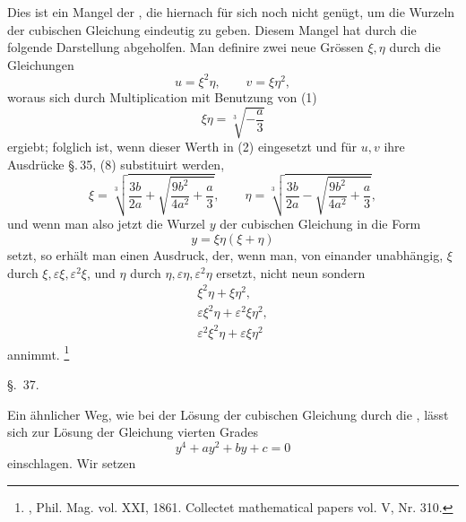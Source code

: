 
Dies ist ein Mangel der , die hiernach für sich noch nicht genügt, um die Wurzeln der cubischen Gleichung eindeutig zu geben. Diesem Mangel hat  durch die folgende Darstellung abgeholfen. Man definire zwei neue Grössen $\xi,\eta$ durch die Gleichungen
\begin{equation}
u=\xi^2\eta,
\qquad
v=\xi\eta^2,
\tag{2}
\end{equation}
woraus sich durch Multiplication mit Benutzung von (1)
\begin{equation}
\xi\eta=\sqrt[3]{-\frac a3}
\tag{3}
\end{equation}
ergiebt; folglich ist, wenn dieser Werth in (2) eingesetzt und für $u,v$ ihre Ausdrücke \S.\,35, (8) substituirt werden,
\begin{equation}
\xi=\sqrt[3]{\frac{3b}{2a}+\sqrt{\frac{9b^2}{4a^2}+\frac a3}},\qquad
\eta=\sqrt[3]{\frac{3b}{2a}-\sqrt{\frac{9b^2}{4a^2}+\frac a3}},
\tag{4}
\end{equation}
und wenn man also jetzt die Wurzel $y$ der cubischen Gleichung in die Form
\begin{equation}
y=\xi\eta(\xi+\eta)
\tag{5}
\end{equation}
setzt, so erhält man einen Ausdruck, der, wenn man, von einander unabhängig, $\xi$ durch $\xi,\varepsilon\xi,\varepsilon^2\xi$, und $\eta$ durch $\eta,\varepsilon\eta,\varepsilon^2\eta$ ersetzt, nicht neun sondern 
\[
\begin{array}{c}
\xi^2\eta+\xi\eta^2,\\
\varepsilon\xi^2\eta+\varepsilon^2\xi\eta^2,\\
\varepsilon^2\xi^2\eta+\varepsilon\xi\eta^2
\end{array}
\]
annimmt.
\footnote{, Phil. Mag. vol. XXI, 1861. Collectet mathematical papers vol. V, Nr. 310.}%



\begin{center}
{\large \S.\ 37.}

\vspace{0.5em}
{\large{}}
\end{center}

Ein ähnlicher Weg, wie bei der Lösung der cubischen Gleichung durch die , lässt sich zur Lösung der Gleichung vierten Grades
\begin{equation}
 y^4+ay^2+by+c=0
\tag{1}
\end{equation}
einschlagen. Wir setzen
